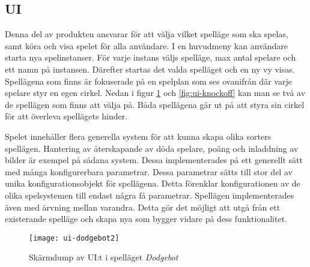 \pagebreak

\subsection{UI}
Denna del av produkten ansvarar för att välja vilket spelläge som ska spelas, samt köra och visa spelet för alla användare. I en huvudmeny kan användare starta nya spelinstanser. För varje instans väljs spelläge, max antal spelare och ett namn på instansen. Därefter startas det valda spelläget och en ny vy visas. Spellägena som finns är fokuserade på en spelplan som ses ovanifrån där varje spelare styr en egen cirkel. Nedan i figur \ref{fig:ui-dodgebot} och \ref{fig:ui-knockoff} kan man se två av de spellägen som finns att välja på. Båda spellägena går ut på att styra sin cirkel för att överleva spellägets hinder.

Spelet innehåller flera generella system för att kunna skapa olika sorters spellägen. Hantering av återskapande av döda spelare, poäng och inladdning av bilder är exempel på sådana system. Dessa implementerades på ett generellt sätt med många konfigurerbara parametrar. Dessa parametrar sätts till stor del av unika konfigurationsobjekt för spellägena. Detta förenklar konfigurationen av de olika spelsystemen till endast några få parametrar. Spellägen implementerades även med ärvning mellan varandra. Detta gör det möjligt att utgå från ett existerande spelläge och skapa nya som bygger vidare på dess funktionalitet.

\begin{figure}[h]
    \centering
    \texttt{[image: ui-dodgebot2]}
    \caption{Skärmdump av UI:t i spelläget \textit{Dodgebot}}
    \label{fig:ui-dodgebot}
\end{figure}

